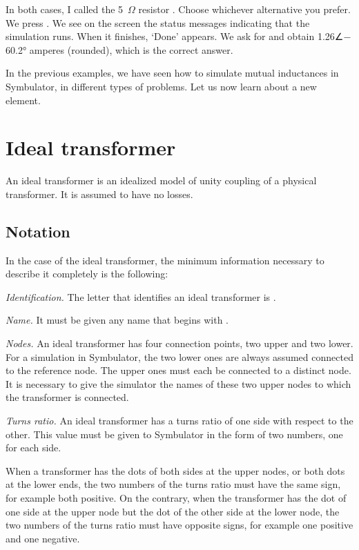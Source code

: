 In both cases, I called the 5~$\Omega$ resistor . Choose
whichever alternative you prefer. We press . We see on
the screen the status messages indicating that the simulation runs.
When it finishes, `Done' appears. We ask for  and
obtain 1.26∠$-$60.2° amperes (rounded), which is the correct answer.

In the previous examples, we have seen how to simulate mutual
inductances in Symbulator, in different types of problems. Let us
now learn about a new element.

\section{Ideal transformer}

An ideal transformer is an idealized model of unity coupling of a
physical transformer. It is assumed to have no losses.

\subsection{Notation}

In the case of the ideal transformer, the minimum information
necessary to describe it completely is the following:

\emph{Identification.} The letter that identifies an ideal
transformer is .

\emph{Name.} It must be given any name that begins with .

\emph{Nodes.} An ideal transformer has four connection points, two
upper and two lower. For a simulation in Symbulator, the two lower
ones are always assumed connected to the reference node. The upper
ones must each be connected to a distinct node. It is necessary to
give the simulator the names of these two upper nodes to which the
transformer is connected.

\emph{Turns ratio.} An ideal transformer has a turns ratio of one
side with respect to the other. This value must be given to
Symbulator in the form of two numbers, one for each side.

When a transformer has the dots of both sides at the upper nodes, or
both dots at the lower ends, the two numbers of the turns ratio must
have the same sign, for example both positive. On the contrary, when
the transformer has the dot of one side at the upper node but the
dot of the other side at the lower node, the two numbers of the
turns ratio must have opposite signs, for example one positive and
one negative.

